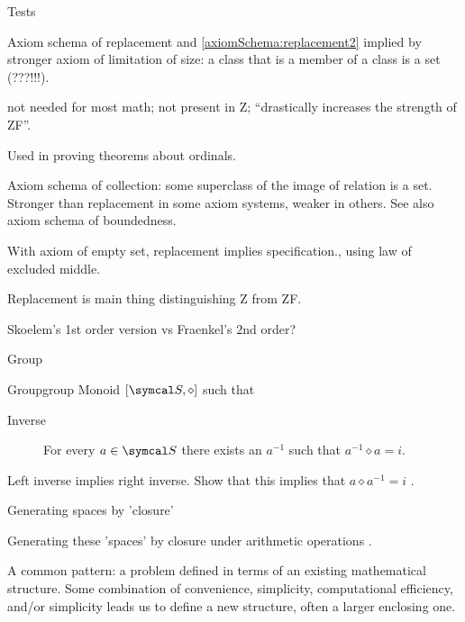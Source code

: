 \documentclass{PalisadesLakesArticle}
\begin{document}
\begin{plSection}{Tests}
\begin{plSection}{Axiom schema of replacement}
and \cref{axiomSchema:replacement2} implied by stronger
axiom of limitation of 
size\cite{wiki:AxiomOfLimitationOfSize}:
a class that is a member of a class is a set (???!!!).

 not needed for most math;
not present in \textsf{Z};
``drastically increases the strength of \textsf{ZF}''.

Used in proving theorems about ordinals.

Axiom schema of collection: some superclass of 
the image of relation is a set.
Stronger than replacement
in some axiom systems, weaker in others.
See also axiom schema of boundedness.

With axiom of empty set, replacement implies specification.,
using law of excluded middle.

Replacement is main thing distinguishing \textsf{Z}
from \textsf{ZF}.

Skoelem's 1st order version vs Fraenkel's $2$nd order?

\end{plSection}%
\begin{plSection}{Group}

\begin{plDefinition}{Group}{group}
Monoid $\left[ \Set{S}, \diamond \right]$ such that
\begin{description}
 \item[Inverse] For every $a \in \Set{S}$ there exists an
 $a^{-1}$ such that $a^{-1} \diamond a = i$.
\end{description}
\end{plDefinition}

\begin{plExercise}{}{Left inverse implies right inverse.}
Show that this implies that $a \diamond a^{-1} = i$ .
\end{plExercise} 

\end{plSection}%
\begin{plSection}{Generating spaces by 'closure'}

Generating these 'spaces' by closure under arithmetic operations
\cite{PickertGorke:1974:RealNumbers}.

A common pattern: 
a problem defined in terms of an existing mathematical
structure. 
Some combination of convenience, simplicity, computational
efficiency, and/or simplicity leads us to define a new structure, 
often a larger enclosing one.


\end{plSection}
\end{plSection}
\end{document}
